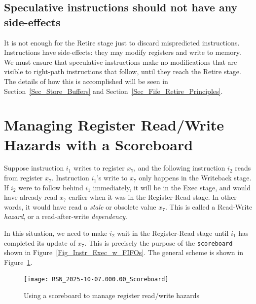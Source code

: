 
\subsection{Speculative instructions should not have any side-effects}

It is not enough for the Retire stage just to discard mispredicted
instructions.  Instructions have side-effects: they may modify
registers and write to memory.  We must ensure that speculative
instructions make no modifications that are visible to right-path
instructions that follow, until they reach the Retire stage.  The
details of how this is accomplished will be seen in
Section~\ref{Sec_Store_Buffers} and Section~\ref{Sec_Fife_Retire_Principles}.


\section{Managing Register Read/Write Hazards with a Scoreboard}

\label{Sec_Scoreboards}


Suppose instruction $i_1$ writes to register $x_7$, and the following
instruction $i_2$ reads from register $x_7$.  Instruction $i_1$'s
write to $x_7$ only happens in the Writeback stage.  If $i_2$ were to
follow behind $i_1$ immediately, it will be in the Exec stage, and
would have already read $x_7$ earlier when it was in the Register-Read
stage.  In other words, it would have read a \emph{stale} or obsolete
value $x_7$.  This is called a Read-Write \emph{hazard}, or a
read-after-write \emph{dependency}.

In this situation, we need to make $i_2$ wait in the Register-Read
stage until $i_1$ has completed its update of $x_7$.  This is
precisely the purpose of the \verb|scoreboard| shown in
Figure~\ref{Fig_Instr_Exec_w_FIFOs}.  The general scheme is shown in
Figure~\ref{Fig_RISCV_Scoreboard}.
\begin{figure}[htbp]
  \centerline{\texttt{[image: RSN\_2025-10-07.000.00\_Scoreboard]}}
  \caption{\label{Fig_RISCV_Scoreboard}
           Using a scoreboard to manage register read/write hazards}
\end{figure}

